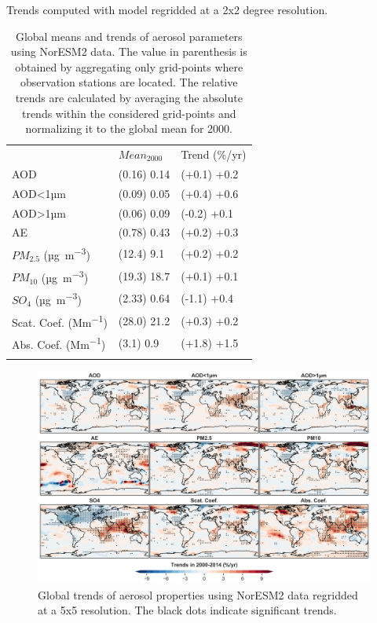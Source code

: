 \documentclass[journal abbreviation, manuscript]{copernicus}
\begin{document}
Trends computed with model regridded at a 2x2 degree resolution.

\begin{table}
 \begin{tabular}{lll}
  \tophline
                                & $Mean_{2000}$ & Trend (\%/yr) \\
  \middlehline
  AOD                           & (0.16) 0.14   & (+0.1) +0.2   \\
  AOD<1µm                       & (0.09) 0.05   & (+0.4) +0.6   \\
  AOD>1µm                       & (0.06) 0.09   & (-0.2) +0.1   \\
  AE                            & (0.78) 0.43   & (+0.2) +0.3   \\
  $PM_{2.5}$ (\unit{µg.m^{-3}}) & (12.4) 9.1    & (+0.2) +0.2   \\
  $PM_{10}$ (\unit{µg.m^{-3}})  & (19.3) 18.7   & (+0.1) +0.1   \\
  $SO_{4}$ (\unit{µg.m^{-3}})   & (2.33) 0.64   & (-1.1) +0.4   \\
  Scat. Coef. (\unit{Mm^{-1}})  & (28.0) 21.2   & (+0.3) +0.2   \\
  Abs. Coef. (\unit{Mm^{-1}})   & (3.1) 0.9     & (+1.8) +1.5   \\
  \bottomhline
 \end{tabular}
 \caption{Global means and trends of aerosol parameters using NorESM2 data. The value in parenthesis is obtained by aggregating only grid-points where observation stations are located. The relative trends are calculated by averaging the absolute trends within the considered grid-points and normalizing it to the global mean for 2000.}
 \label{mod_tab_trends}
\end{table}

\begin{figure}[t]
 \includegraphics[width=16cm]{../scripts/figs/trends_map.png}
 \caption{Global trends of aerosol properties using NorESM2 data regridded at a 5x5 resolution. The black dots indicate significant trends.}
 \label{mod_map_trends}
\end{figure}
\end{document}
